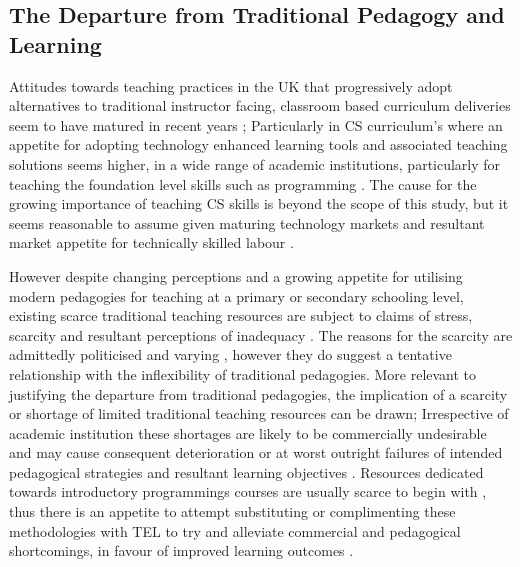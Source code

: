 \label{sec:sec01}
\subsection{The Departure from Traditional Pedagogy and Learning}
\label{subsec:subsec01}

Attitudes towards teaching practices in the UK that progressively adopt alternatives to traditional instructor facing, classroom based curriculum deliveries seem to have matured in recent years \cite{Jessica2012,CinYeeHoo,Stuart2014}; Particularly in CS curriculum's where an appetite for adopting technology enhanced learning tools and associated teaching solutions seems higher, in a wide range of academic institutions, particularly for teaching the foundation level skills such as programming \cite{Ibanez2014,Serrano-Laguna2015,Bittencourt2015,Chigona2008,CinYeeHoo,Jessica2012,Stuart2014}. The cause for the growing importance of teaching CS skills is beyond the scope of this study, but it seems reasonable to assume  given maturing technology markets and resultant market appetite for technically skilled labour \cite{CinYeeHoo,Stuart2014,Jessica2012}.

However despite changing perceptions and a growing appetite for utilising modern pedagogies for teaching at a primary or secondary schooling level, existing scarce traditional teaching resources are subject to claims of stress, scarcity and  resultant perceptions of inadequacy \cite{CinYeeHoo}. The reasons for the scarcity are admittedly politicised and varying \cite{Stuart2014,CinYeeHoo,Jessica2012}, however they do suggest a tentative relationship with the inflexibility of traditional pedagogies. More relevant to justifying the departure from traditional pedagogies, the implication of a scarcity or shortage  of limited traditional teaching resources can be drawn; Irrespective of academic institution these shortages are likely to be commercially undesirable and may cause consequent deterioration or at worst outright failures of intended pedagogical strategies and resultant learning objectives \cite{Gordon2014,CinYeeHoo,Stuart2014}. Resources dedicated towards introductory programmings courses are usually scarce to begin with \cite{Chigona2008} , thus there is an appetite to attempt substituting or complimenting these methodologies with TEL to try and alleviate commercial and pedagogical shortcomings, in favour of improved learning outcomes \cite{Chigona2008,Hackelbusch2007,Serrano-Laguna2015,Bittencourt2015,RickReis,Chat2014}.


